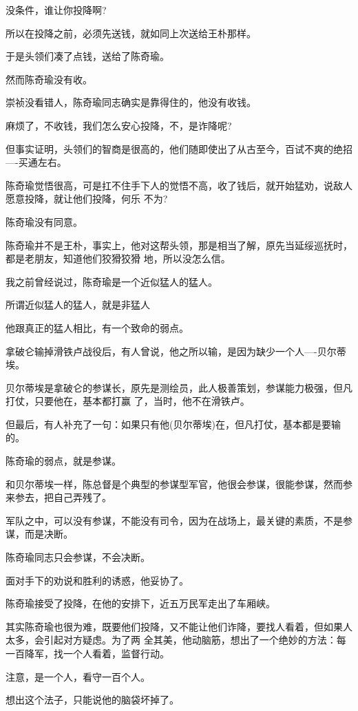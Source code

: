 \documentclass[11pt,a4paper,onecolumn]{article}
\begin{document}
没条件，谁让你投降啊?

所以在投降之前，必须先送钱，就如同上次送给王朴那样。

于是头领们凑了点钱，送给了陈奇瑜。

然而陈奇瑜没有收。

崇祯没看错人，陈奇瑜同志确实是靠得住的，他没有收钱。

麻烦了，不收钱，我们怎么安心投降，不，是诈降呢?

但事实证明，头领们的智商是很高的，他们随即使出了从古至今，百试不爽的绝招----买通左右。

陈奇瑜觉悟很高，可是扛不住手下人的觉悟不高，收了钱后，就开始猛劝，说敌人愿意投降，就让他们投降，何乐
不为?

陈奇瑜没有同意。

陈奇瑜并不是王朴，事实上，他对这帮头领，那是相当了解，原先当延绥巡抚时，都是老朋友，知道他们狡猾狡猾
地，所以没怎么信。

我之前曾经说过，陈奇瑜是一个近似猛人的猛人。

所谓近似猛人的猛人，就是非猛人

他跟真正的猛人相比，有一个致命的弱点。

拿破仑输掉滑铁卢战役后，有人曾说，他之所以输，是因为缺少一个人----贝尔蒂埃。

贝尔蒂埃是拿破仑的参谋长，原先是测绘员，此人极善策划，参谋能力极强，但凡打仗，只要他在，基本都打赢
了，当时，他不在滑铁卢。

但最后，有人补充了一句：如果只有他(贝尔蒂埃)在，但凡打仗，基本都是要输的。

陈奇瑜的弱点，就是参谋。

和贝尔蒂埃一样，陈总督是个典型的参谋型军官，他很会参谋，很能参谋，然而参来参去，把自己弄残了。

军队之中，可以没有参谋，不能没有司令，因为在战场上，最关键的素质，不是参谋，而是决断。

陈奇瑜同志只会参谋，不会决断。

面对手下的劝说和胜利的诱惑，他妥协了。

陈奇瑜接受了投降，在他的安排下，近五万民军走出了车厢峡。

其实陈奇瑜也很为难，既要他们投降，又不能让他们诈降，要找人看着，但如果人太多，会引起对方疑虑。为了两
全其美，他动脑筋，想出了一个绝妙的方法：每一百降军，找一个人看着，监督行动。

注意，是一个人，看守一百个人。

想出这个法子，只能说他的脑袋坏掉了。

\section[\thesection]{}
\end{document}
